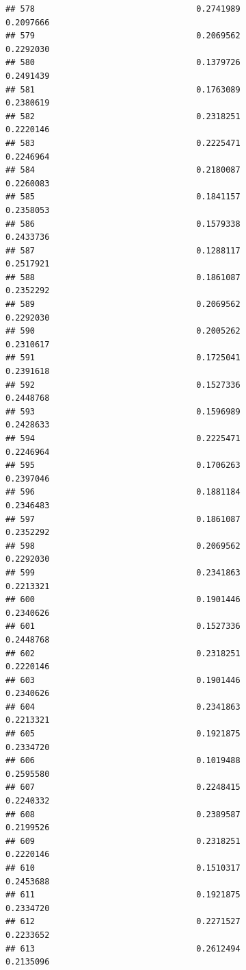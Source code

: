 \documentclass[
  american,
  man,floatsintext]{apa7}
\begin{document}
\begin{verbatim}
## 578                                 0.2741989               0.2097666
## 579                                 0.2069562               0.2292030
## 580                                 0.1379726               0.2491439
## 581                                 0.1763089               0.2380619
## 582                                 0.2318251               0.2220146
## 583                                 0.2225471               0.2246964
## 584                                 0.2180087               0.2260083
## 585                                 0.1841157               0.2358053
## 586                                 0.1579338               0.2433736
## 587                                 0.1288117               0.2517921
## 588                                 0.1861087               0.2352292
## 589                                 0.2069562               0.2292030
## 590                                 0.2005262               0.2310617
## 591                                 0.1725041               0.2391618
## 592                                 0.1527336               0.2448768
## 593                                 0.1596989               0.2428633
## 594                                 0.2225471               0.2246964
## 595                                 0.1706263               0.2397046
## 596                                 0.1881184               0.2346483
## 597                                 0.1861087               0.2352292
## 598                                 0.2069562               0.2292030
## 599                                 0.2341863               0.2213321
## 600                                 0.1901446               0.2340626
## 601                                 0.1527336               0.2448768
## 602                                 0.2318251               0.2220146
## 603                                 0.1901446               0.2340626
## 604                                 0.2341863               0.2213321
## 605                                 0.1921875               0.2334720
## 606                                 0.1019488               0.2595580
## 607                                 0.2248415               0.2240332
## 608                                 0.2389587               0.2199526
## 609                                 0.2318251               0.2220146
## 610                                 0.1510317               0.2453688
## 611                                 0.1921875               0.2334720
## 612                                 0.2271527               0.2233652
## 613                                 0.2612494               0.2135096

\end{verbatim}
\end{document}
